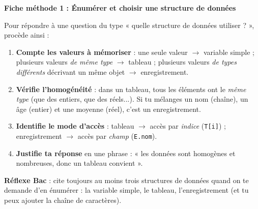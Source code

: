 \documentclass[11pt]{article}
\newcommand{\cle}[1]{{\popxbold\color{popdark}#1}}
\begin{document}
\textbf{Fiche méthode 1 : Énumérer et choisir une structure de données}\par
\begin{methode}
Pour répondre à une question du type « quelle structure de données utiliser ? », procède ainsi :
\begin{enumerate}
\item \textbf{Compte les valeurs à mémoriser} : une seule valeur $\rightarrow$ variable simple ; plusieurs valeurs \emph{de même type} $\rightarrow$ \cle{tableau} ; plusieurs valeurs \emph{de types différents} décrivant un même objet $\rightarrow$ \cle{enregistrement}.
\item \textbf{Vérifie l'homogénéité} : dans un tableau, tous les éléments ont le \emph{même type} (que des entiers, que des réels...). Si tu mélanges un nom (chaîne), un âge (entier) et une moyenne (réel), c'est un enregistrement.
\item \textbf{Identifie le mode d'accès} : tableau $\rightarrow$ accès par \emph{indice} (\texttt{T[i]}) ; enregistrement $\rightarrow$ accès par \emph{champ} (\texttt{E.nom}).
\item \textbf{Justifie ta réponse} en une phrase : « les données sont homogènes et nombreuses, donc un tableau convient ».
\end{enumerate}
\textbf{Réflexe Bac} : cite toujours au moins trois structures de données quand on te demande d'en énumérer : la variable simple, le tableau, l'enregistrement (et tu peux ajouter la chaîne de caractères).
\end{methode}
\end{document}
